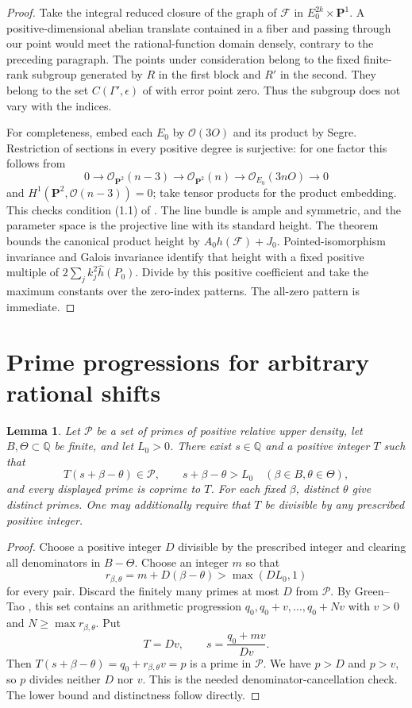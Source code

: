 \documentclass[11pt,a4paper]{article}
\newtheorem{lemma}[theorem]{Lemma}
\newcommand{\Q}{\mathbb Q}\newcommand{\Z}{\mathbb Z}
\begin{document}
\begin{proof}
Take the integral reduced closure of the graph of $\mathcal F$ in
$E_0^{2k}\times\mathbf P^1$. A positive-dimensional abelian translate
contained in a fiber and passing through our point would meet the
rational-function domain densely, contrary to the preceding paragraph.
The points under consideration belong to the fixed finite-rank
subgroup generated by $R$ in the first block and $R'$ in the second.
They belong to the set $C(\Gamma',\epsilon)$ of \cite{VB} with error
point zero. Thus the subgroup does not vary with the indices.

For completeness, embed each $E_0$ by $\mathcal O(3O)$ and its
product by Segre. Restriction of sections in every positive degree is
surjective: for one factor this follows from
\[
0\to\mathcal O_{\mathbf P^2}(n-3)\to\mathcal O_{\mathbf P^2}(n)
 \to\mathcal O_{E_0}(3nO)\to0
\]
and $H^1(\mathbf P^2,\mathcal O(n-3))=0$; take tensor products for
the product embedding. This checks condition (1.1) of \cite{VB}.
The line bundle is ample and symmetric, and the parameter space is
the projective line with its standard height. The theorem bounds the
canonical product height by $A_0h(\mathcal F)+J_0$.
Pointed-isomorphism invariance and Galois invariance identify that
height with a fixed positive multiple of
$2\sum_j k_j^2\widehat h(P_0)$. Divide by this positive coefficient
and take the maximum constants over the zero-index patterns. The
all-zero pattern is immediate.
\end{proof}

\section{Prime progressions for arbitrary rational shifts}
\begin{lemma}\label{lem:progression}
Let $\mathcal P$ be a set of primes of positive relative upper
density, let $B,\Theta\subset\Q$ be finite, and let $L_0>0$.
There exist $s\in\Q$ and a positive integer $T$ such that
\[
 T(s+\beta-\theta)\in\mathcal P,\qquad
 s+\beta-\theta>L_0
 \quad(\beta\in B,\theta\in\Theta),
\]
and every displayed prime is coprime to $T$. For each fixed $\beta$,
distinct $\theta$ give distinct primes. One may additionally require
that $T$ be divisible by any prescribed positive integer.
\end{lemma}
\begin{proof}
Choose a positive integer $D$ divisible by the prescribed integer and
clearing all denominators in $B-\Theta$. Choose an integer $m$ so that
\[
 r_{\beta,\theta}=m+D(\beta-\theta)>
 \max(DL_0,1)
\]
for every pair. Discard the finitely many primes at most $D$ from
$\mathcal P$. By Green--Tao \cite[Theorem 1.2]{GT}, this set contains
an arithmetic progression $q_0,q_0+v,\ldots,q_0+Nv$ with $v>0$ and
$N\ge\max r_{\beta,\theta}$. Put
\[
 T=Dv,\qquad s=\frac{q_0+mv}{Dv}.
\]
Then $T(s+\beta-\theta)=q_0+r_{\beta,\theta}v=p$ is a prime
in $\mathcal P$. We have $p>D$ and $p>v$, so $p$ divides neither
$D$ nor $v$. This is the needed denominator-cancellation check.
The lower bound and distinctness follow directly.
\end{proof}
\end{document}
